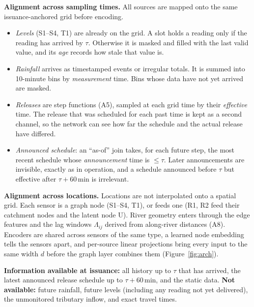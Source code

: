 \textbf{Alignment across sampling times.} All sources are mapped onto the same
issuance-anchored grid before encoding.
\begin{itemize}[leftmargin=*,itemsep=1pt]
\item \emph{Levels} (S1--S4, T1) are already on the grid. A slot holds a reading only if the
reading has arrived by $\tau$. Otherwise it is masked and filled with the last valid value, and
its \emph{age} records how stale that value is.
\item \emph{Rainfall} arrives as timestamped events or irregular totals. It is summed into 10-minute bins
by \emph{measurement} time. Bins whose data have not yet arrived are masked.
\item \emph{Releases} are step functions (A5), sampled at each grid time by their \emph{effective}
time. The release that was scheduled for each past time is kept as a second channel, so the network
can see how far the schedule and the actual release have differed.
\item \emph{Announced schedule}: an ``as-of'' join takes, for each future step, the most recent
schedule whose \emph{announcement} time is $\le\tau$. Later announcements are invisible, exactly as
in operation, and a schedule announced before $\tau$ but effective after $\tau+60$\,min is irrelevant.
\end{itemize}

\textbf{Alignment across locations.} Locations are not interpolated onto a spatial grid. Each
sensor is a graph node (S1--S4, T1), or feeds one (R1, R2 feed their catchment nodes and the latent
node U). River geometry enters through the edge features and the lag windows $\Lambda_{ij}$
derived from along-river distances (A8). Encoders are shared across sensors of the same type, a
learned node embedding tells the sensors apart, and per-source linear projections bring every input
to the same width $d$ before the graph layer combines them (Figure~\ref{fig:arch}).

\textbf{Information available at issuance:} all history up to $\tau$ that has arrived, the latest
announced release schedule up to $\tau+60$\,min, and the static data. \textbf{Not available:} future
rainfall, future levels (including any reading not yet delivered), the unmonitored tributary inflow,
and exact travel times.
